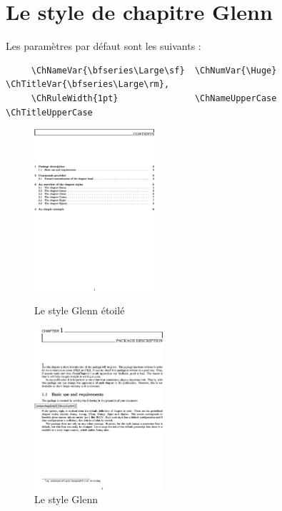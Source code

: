\documentclass{report}
\begin{document}
    \section{Le style de chapitre Glenn}
    Les paramètres par défaut sont les suivants :
    {\small\begin{verbatim}
     \ChNameVar{\bfseries\Large\sf}  \ChNumVar{\Huge}  \ChTitleVar{\bfseries\Large\rm}, 
     \ChRuleWidth{1pt}               \ChNameUpperCase  \ChTitleUpperCase
    \end{verbatim}}
    \begin{figure}[h]
      \begin{minipage}{7 cm}
        \centerline{\includegraphics[height=6cm]{Glenns.eps}}
        \caption{Le style Glenn \og étoilé \fg{}}
      \end{minipage}\hfill
      \begin{minipage}{7 cm}
        \centerline{\includegraphics[height=6cm]{Glenn.eps}}
        \caption{Le style Glenn}
      \end{minipage}\hfill
    \end{figure}
\end{document}
